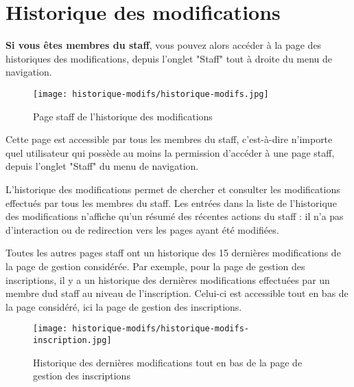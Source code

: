 \section{Historique des modifications}

\textbf{Si vous êtes membres du staff}, vous pouvez alors accéder à la page des historiques des modifications, depuis l'onglet "Staff" tout à droite du menu de navigation.

\begin{figure}[H]
\centering
\texttt{[image: historique-modifs/historique-modifs.jpg]}
\caption{Page staff de l'historique des modifications}
\end{figure}

Cette page est accessible par tous les membres du staff, c'est-à-dire n'importe quel utilisateur qui possède au moins la permission d'accéder à une page staff, depuis l'onglet "Staff" du menu de navigation.\newline

L'historique des modifications permet de chercher et consulter les modifications effectués par tous les membres du staff. Les entrées dans la liste de l'historique des modifications n'affiche qu'un résumé des récentes actions du staff : il n'a pas d'interaction ou de redirection vers les pages ayant été modifiées.\newline

Toutes les autres pages staff ont un historique des 15 dernières modifications de la page de gestion considérée. Par exemple, pour la page de gestion des inscriptions, il y a un historique des dernières modifications effectuées par un membre dud staff au niveau de l'inscription. Celui-ci est accessible tout en bas de la page considéré, ici la page de gestion des inscriptions.

\begin{figure}[H]
\centering
\texttt{[image: historique-modifs/historique-modifs-inscription.jpg]}
\caption{Historique des dernières modifications tout en bas de la page de gestion des inscriptions}
\end{figure}